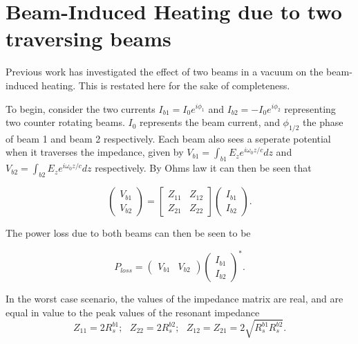\documentclass{cernrep}
\begin{document}
\section{Beam-Induced Heating due to two traversing beams}

Previous work \cite{Grudiev:twoBeamCol} has investigated the effect of two beams in a vacuum on the beam-induced heating. This is restated here for the sake of completeness.

To begin, consider the two currents $I_{b1} = I_{0}e^{i\phi_{1}}$ and $I_{b2} = -I_{0}e^{i\phi_{2}}$ representing two counter rotating beams. $I_{0}$ represents the beam current, and $\phi_{1/2}$ the phase of beam 1 and beam 2 respectively. Each beam also sees a seperate potential when it traverses the impedance, given by $V_{b1} = \int_{b1} E_{z} e^{i\omega_{0}z/c} dz$ and $V_{b2} = \int_{b2} E_{z} e^{i\omega_{0}z/c} dz$ respectively. By Ohms law it can then be seen that

\begin{equation}
\begin{pmatrix}
V_{b1} \\
V_{b2}
\end{pmatrix}
=
\begin{bmatrix}
Z_{11} & Z_{12} \\
Z_{21} & Z_{22}
\end{bmatrix}
\begin{pmatrix}
I_{b1} \\
I_{b2}
\end{pmatrix}.
\end{equation}

The power loss due to both beams can then be seen to be

\begin{equation}
P_{loss} = \begin{pmatrix}
V_{b1} & V_{b2}
\end{pmatrix}
\begin{pmatrix}
I_{b1} \\
I_{b2}
\end{pmatrix}^{*}.
\end{equation}

In the worst case scenario, the values of the impedance matrix are real, and are equal in value to the peak values of the resonant impedance
\begin{equation}
Z_{11} = 2R^{b1}_{s};\text{    } Z_{22} = 2R^{b2}_{s};\text{    }  Z_{12} = Z_{21} = 2 \sqrt{R^{b1}_{s}R^{b2}_{s}}.
\end{equation}
\end{document}
